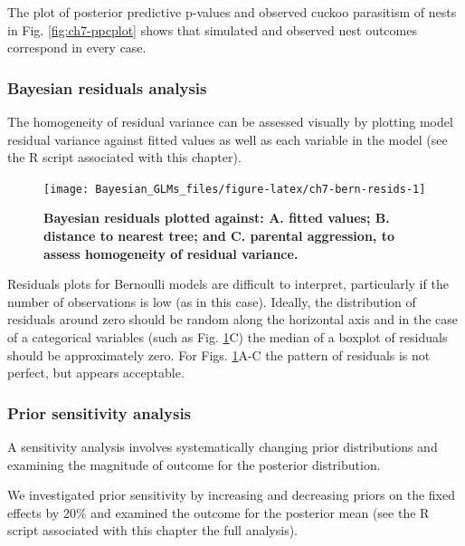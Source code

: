 \documentclass[
]{book}
\begin{document}
The plot of posterior predictive p-values and observed cuckoo parasitism of nests in Fig. \ref{fig:ch7-ppcplot} shows that simulated and observed nest outcomes correspond in every case.

\hypertarget{bern-resids}{%
\subsubsection{Bayesian residuals analysis}\label{bern-resids}}

The homogeneity of residual variance can be assessed visually by plotting model residual variance against fitted values as well as each variable in the model (see the R script associated with this chapter).



\begin{figure}

{\centering \texttt{[image: Bayesian\_GLMs\_files/figure-latex/ch7-bern-resids-1]} 

}

\caption{\textbf{Bayesian residuals plotted against: A. fitted values; B. distance to nearest tree; and C. parental aggression, to assess homogeneity of residual variance.}}\label{fig:ch7-bern-resids}
\end{figure}

Residuals plots for Bernoulli models are difficult to interpret, particularly if the number of observations is low (as in this case). Ideally, the distribution of residuals around zero should be random along the horizontal axis and in the case of a categorical variables (such as Fig. \ref{fig:ch7-bern-resids}C) the median of a boxplot of residuals should be approximately zero. For Figs. \ref{fig:ch7-bern-resids}A-C the pattern of residuals is not perfect, but appears acceptable.

\hypertarget{bern-sens}{%
\subsubsection{Prior sensitivity analysis}\label{bern-sens}}

A sensitivity analysis involves systematically changing prior distributions and examining the magnitude of outcome for the posterior distribution.

We investigated prior sensitivity by increasing and decreasing priors on the fixed effects by 20\% and examined the outcome for the posterior mean (see the R script associated with this chapter the full analysis).
\end{document}
